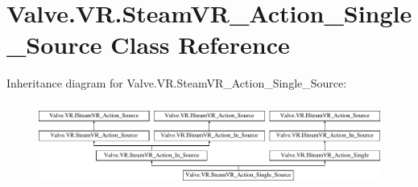 \hypertarget{class_valve_1_1_v_r_1_1_steam_v_r___action___single___source}{}\section{Valve.\+V\+R.\+Steam\+V\+R\+\_\+\+Action\+\_\+\+Single\+\_\+\+Source Class Reference}
\label{class_valve_1_1_v_r_1_1_steam_v_r___action___single___source}
Inheritance diagram for Valve.\+V\+R.\+Steam\+V\+R\+\_\+\+Action\+\_\+\+Single\+\_\+\+Source\+:\begin{figure}[H]
\begin{center}
\leavevmode
\includegraphics[height=2.849873cm]{class_valve_1_1_v_r_1_1_steam_v_r___action___single___source}
\end{center}
\end{figure}
